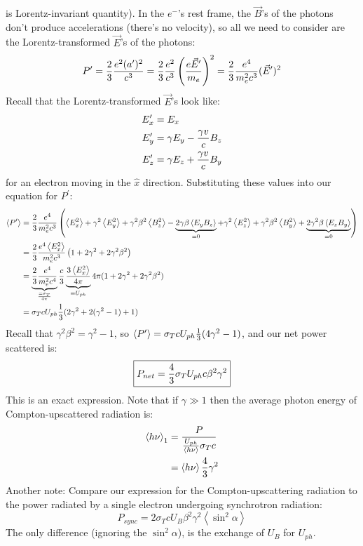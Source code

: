 \documentclass[11pt]{article}
\def\^{\hat}
\def\mean#1{\left\langle #1\right\rangle}
\def\ef{\vec E}
\def\bfield{{\vec B}}
\begin{document}
is Lorentz-invariant quantity).  In the $e^-$'s rest frame, the $\bfield$'s of
the photons don't produce accelerations (there's no velocity), so all we
need to consider are the Lorentz-transformed $\ef$'s of the photons:
$$P^\prime={2\over3}{e^2(a^\prime)^2\over c^3}
={2\over3}{e^2\over c^3}\left({e\ef^\prime\over m_e}\right)^2
={2\over3}{e^4\over m_e^2c^3}(\ef^\prime)^2$$
Recall that the Lorentz-transformed $\ef$'s look like:
$$\begin{aligned}E_x^\prime&=E_x\\ 
E_y^\prime&=\gamma E_y-{\gamma v\over c}B_z\\ 
E_z^\prime&=\gamma E_z+{\gamma v\over c}B_y\\ \end{aligned}$$
for an electron moving in the $\^x$ direction.  Substituting these values
into our equation for $P^\prime$:
$$\begin{aligned}\mean{P^\prime}&={2\over3}{e^4\over m_e^2c^3}\left(\mean{E_x^2}+
\gamma^2\mean{E_y^2}+\gamma^2\beta^2\mean{B_z^2}-\underbrace{2\gamma\beta
\mean{E_yB_z}}_{=0}+\gamma^2\mean{E_z^2}+\gamma^2\beta^2\mean{B_y^2}
+\underbrace{2\gamma^2\beta\mean{E_zB_y}}_{=0}\right)\\ 
&={2\over3}{e^4\mean{E_x^2}\over m_e^2c^3}\left(1+2\gamma^2+2\gamma^2\beta^2
\right)\\ 
&=\underbrace{{2\over3}{e^4\over m_e^2c^4}}_{=\sigma_T\over4\pi}
{c\over3}\underbrace{3\mean{E_x^2}\over4\pi}_{=U_{ph}}
4\pi(1+2\gamma^2+2\gamma^2\beta^2)\\ 
&=\sigma_TcU_{ph}{1\over3}(2\gamma^2+2(\gamma^2-1)+1)\\ \end{aligned}$$
Recall that $\gamma^2\beta^2=\gamma^2-1$, so $\mean{P^\prime}=\sigma_T
cU_{ph}{1\over3}(4\gamma^2-1)$, and our net power scattered is:
$$\boxed{P_{net}={4\over3}\sigma_TU_{ph}c\beta^2\gamma^2}$$
This is an exact expression.  Note that if $\gamma\gg1$ then the average photon
energy of Compton-upscattered radiation is:
$$\begin{aligned}\mean{h\nu}_1&={P\over{U_{ph}\over\mean{h\nu}}\sigma_Tc}\\ 
&=\mean{h\nu}{4\over3}\gamma^2\\ \end{aligned}$$
Another note: Compare our expression for the Compton-upscattering radiation
to the power radiated by a single electron undergoing synchrotron radiation:
$$P_{sync}=2\sigma_TcU_B\beta^2\gamma^2\mean{\sin^2\alpha}$$
The only difference (ignoring the $\sin^2\alpha$), is the exchange of
$U_B$ for $U_{ph}$.\par
\end{document}
